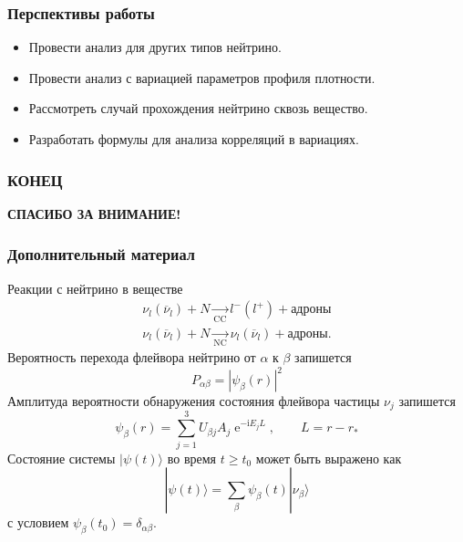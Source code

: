 \documentclass[utf8,9pt,mathserif,usepdftitle=false]{beamer}
\renewcommand{\exp}{\operatorname{e}}
\renewcommand{\imath}{\mathrm{i}}
\begin{document}
\begin{frame}
	\frametitle{Перспективы работы}
	\begin{itemize}
  \item<1-> Провести анализ для других типов нейтрино.
  \item<2-> Провести анализ с вариацией параметров профиля плотности.
  \item<3-> Рассмотреть случай прохождения нейтрино сквозь вещество. 
  \item<4-> Разработать формулы для анализа корреляций в вариациях.
	\end{itemize}
\end{frame}

\begin{frame}
  \frametitle{КОНЕЦ}%
  \LARGE\centering\bfseries
  СПАСИБО ЗА ВНИМАНИЕ!
\end{frame}

\begin{frame}
  \frametitle{Дополнительный материал}%
  Реакции с нейтрино в веществе
  \begin{align*}
    \nu_{l}(\overline{\nu}_{l})+N\xrightarrow[\text{CC}]{}l^{-}(l^{+})+\text{адроны}\\[2ex]
    \nu_{l}(\overline{\nu}_{l})+N\xrightarrow[\text{NC}]{}\nu_{l}(\overline{\nu}_{l})+\text{адроны}.
  \end{align*}
  	Вероятность перехода флейвора нейтрино от \(\alpha\) к \(\beta\) запишется
  \begin{equation}
  	P_{\alpha \beta}=|\psi_{\beta}(r)|^{2}
  \end{equation}
  Амплитуда вероятности обнаружения состояния флейвора частицы \(\nu_{j}\) запишется
  \begin{equation}
  	\psi_{\beta}(r)=\sum_{j=1}^{3}U_{\beta j}A_{j}\exp^{-\imath E_{j}L}, \qquad L=r-r_{*}
  \end{equation}
  Состояние системы \(|\psi(t)\rangle\) во время \(t \geqslant t_{0}\) может быть выражено как
  \begin{equation}
  	|\psi(t)\rangle=\sum_{\beta}\psi_{\beta}(t)|\nu_{\beta}\rangle
  \end{equation}
  с условием \(\psi_{\beta}(t_{0})=\delta_{\alpha \beta}\).
\end{frame}
\end{document}
